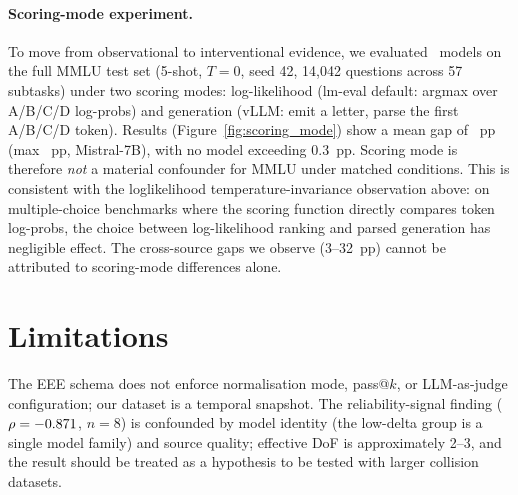 \documentclass[11pt]{article}
\begin{document}
\paragraph{Scoring-mode experiment.}
To move from observational to interventional evidence, we evaluated
\scoringmodels{}~models on the full MMLU test set (5-shot, $T{=}0$, seed 42,
14{,}042 questions across 57 subtasks) under two scoring modes:
log-likelihood (lm-eval default: argmax over A/B/C/D log-probs) and
generation (vLLM: emit a letter, parse the first A/B/C/D token).
Results (Figure~\ref{fig:scoring_mode}) show a mean gap of
\smMeanDelta{}~pp (max \smMaxDelta{}~pp, Mistral-7B), with
no model exceeding 0.3~pp. Scoring mode is therefore
\emph{not} a material confounder for MMLU under matched conditions.
This is consistent with the loglikelihood temperature-invariance
observation above: on multiple-choice benchmarks where the scoring
function directly compares token log-probs, the choice between
log-likelihood ranking and parsed generation has negligible effect.
The cross-source gaps we observe (3--32~pp) cannot be attributed
to scoring-mode differences alone.

\section*{Limitations}

The EEE schema does not enforce normalisation mode, pass@$k$, or
LLM-as-judge configuration; our dataset is a temporal snapshot.
The reliability-signal finding ($\rho = -0.871{}$, $n = 8$) is
confounded by model identity (the low-delta group is a single
model family) and source quality; effective DoF is approximately
2--3, and the result should be treated as a hypothesis to be
tested with larger collision datasets.
\end{document}
